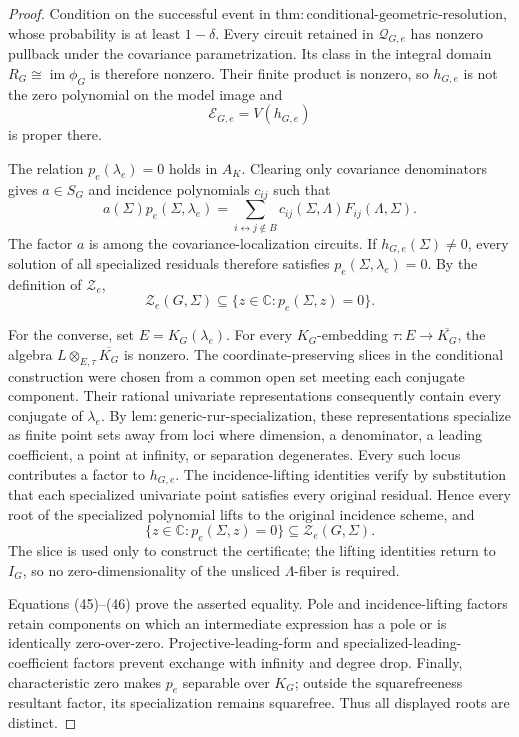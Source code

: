 \documentclass{article}
\begin{document}
\begin{proof}
Condition on the successful event in \(\mathrm{thm:conditional\mbox{-}geometric\mbox{-}resolution}\), whose probability is at least \(1-\delta\).  Every circuit retained in \(\mathcal Q_{G,e}\) has nonzero pullback under the covariance parametrization.  Its class in the integral domain \(R_G\cong\operatorname{im}\phi_G\) is therefore nonzero.  Their finite product is nonzero, so \(h_{G,e}\) is not the zero polynomial on the model image and
\[
 \mathcal E_{G,e}=V(h_{G,e})
\tag{43}
\]
is proper there.

The relation \(p_e(\lambda_e)=0\) holds in \(A_K\).  Clearing only covariance denominators gives \(a\in S_G\) and incidence polynomials \(c_{ij}\) such that
\[
 a(\Sigma)p_e(\Sigma,\lambda_e)
 =\sum_{i\leftrightarrow j\notin B}
 c_{ij}(\Sigma,\Lambda)F_{ij}(\Lambda,\Sigma).
\tag{44}
\]
The factor \(a\) is among the covariance-localization circuits.  If \(h_{G,e}(\Sigma)\ne0\), every solution of all specialized residuals therefore satisfies \(p_e(\Sigma,\lambda_e)=0\).  By the definition of \(\mathcal Z_e\),
\[
 \mathcal Z_e(G,\Sigma)
 \subseteq\{z\in\mathbb C:p_e(\Sigma,z)=0\}.
\tag{45}
\]

For the converse, set \(E=K_G(\lambda_e)\).  For every \(K_G\)-embedding \(\tau:E\to\overline{K_G}\), the algebra \(L\otimes_{E,\tau}\overline{K_G}\) is nonzero.  The coordinate-preserving slices in the conditional construction were chosen from a common open set meeting each conjugate component.  Their rational univariate representations consequently contain every conjugate of \(\lambda_e\).  By \(\mathrm{lem:generic\mbox{-}rur\mbox{-}specialization}\), these representations specialize as finite point sets away from loci where dimension, a denominator, a leading coefficient, a point at infinity, or separation degenerates.  Every such locus contributes a factor to \(h_{G,e}\).  The incidence-lifting identities verify by substitution that each specialized univariate point satisfies every original residual.  Hence every root of the specialized polynomial lifts to the original incidence scheme, and
\[
 \{z\in\mathbb C:p_e(\Sigma,z)=0\}
 \subseteq\mathcal Z_e(G,\Sigma).
\tag{46}
\]
The slice is used only to construct the certificate; the lifting identities return to \(I_G\), so no zero-dimensionality of the unsliced \(\Lambda\)-fiber is required.

Equations (45)--(46) prove the asserted equality.  Pole and incidence-lifting factors retain components on which an intermediate expression has a pole or is identically zero-over-zero.  Projective-leading-form and specialized-leading-coefficient factors prevent exchange with infinity and degree drop.  Finally, characteristic zero makes \(p_e\) separable over \(K_G\); outside the squarefreeness resultant factor, its specialization remains squarefree.  Thus all displayed roots are distinct.
\end{proof}
\end{document}
